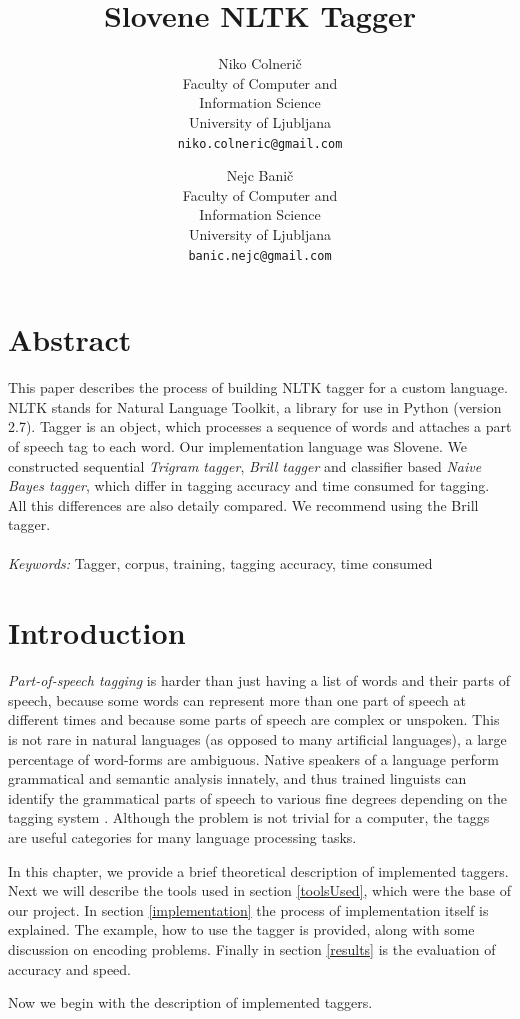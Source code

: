 \documentclass[10pt, conference, compsocconf]{IEEEtran}
\title{Slovene NLTK Tagger}
\author{
	Niko Colnerič \\
	\footnotesize Faculty of Computer and \\
	\footnotesize Information Science \\
	\footnotesize University of Ljubljana \\
	\footnotesize \texttt{niko.colneric@gmail.com} \\
	\and
	Nejc Banič \\
	\footnotesize Faculty of Computer and \\
	\footnotesize Information Science \\
	\footnotesize University of Ljubljana \\
	\footnotesize \texttt{banic.nejc@gmail.com} \\
}
\begin{document}
\maketitle
\thispagestyle{empty}

\section*{Abstract} %
This paper describes the process of building NLTK tagger for a custom language. NLTK stands for Natural Language Toolkit, a library for use in Python (version 2.7).
Tagger is an object, which processes a sequence of words and attaches a part of speech tag to each word.
Our implementation language was Slovene.
We constructed sequential \textit{Trigram tagger}, \textit{Brill tagger} and classifier based \textit{Naive Bayes tagger}, which differ in tagging accuracy and time consumed for tagging. All this differences are also detaily compared. We recommend using the Brill tagger. 
\\\\
\textit{Keywords:} Tagger, corpus, training, tagging accuracy, time consumed

\section{Introduction} %
\textit{Part-of-speech tagging} is harder than just having a list of words and their parts of speech, because some words can represent more than one part of speech at different times and because some parts of speech are complex or unspoken. This is not rare in natural languages (as opposed to many artificial languages), a large percentage of word-forms are ambiguous. Native speakers of a language perform grammatical and semantic analysis innately, and thus trained linguists can identify the grammatical parts of speech to various fine degrees depending on the tagging system \cite{wiki}. Although the problem is not trivial for a computer, the taggs are useful categories for many language processing tasks. 
\par
In this chapter, we provide a brief theoretical description of implemented taggers. Next we will describe the tools used in section \ref{toolsUsed}, which were the base of our project. In section \ref{implementation} the process of implementation itself is explained. The example, how to use the tagger is provided, along with some discussion on encoding problems. Finally in section \ref{results} is the evaluation of accuracy and speed.
\par
Now we begin with the description of implemented taggers.
\end{document}
